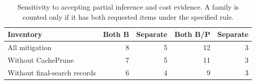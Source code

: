\begin{table}[ht]\centering\footnotesize
\caption{Sensitivity to accepting partial inference and cost evidence. A family is counted only if it has both requested items under the specified rule.}\label{tab:r34-cost-relaxation}
\begin{tabular}{@{}lrrrr@{}}\toprule
Inventory & Both B & Separate & Both B/P & Separate\\\midrule
All mitigation & 8 & 5 & 12 & 3\\
Without CachePrune & 7 & 5 & 11 & 3\\
Without final-search records & 6 & 4 & 9 & 3\\
\bottomrule\end{tabular}\end{table}
